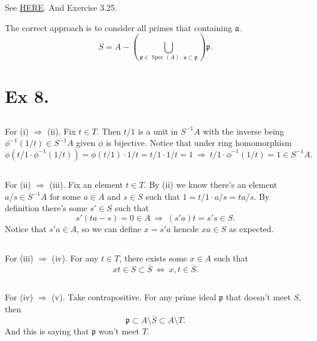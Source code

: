 See \href{https://math.stackexchange.com/questions/1635191/saturation-of-a-multiplicatively-closed-subset}{HERE}. And \cite{altman} Exercise 3.25. 

The correct approach is to consider all primes that containing $\mathfrak a$.
$$\overline{S}=A-\left(\bigcup_{\mathfrak p\in\operatorname{Spec}(A),~ \mathfrak a\subset\mathfrak p}\right)\mathfrak p.$$

\section{Ex 8.}

\subsection{}

For (i) $\Rightarrow$ (ii). Fix $t\in T$. Then $t/1$ is a unit in $S^{-1}A$ with the inverse being $\phi^{-1}(1/t)\in S^{-1}A$ given $\phi$ is bijective. 
Notice that under ring homomorphism 
\[\phi(t/1\cdot\phi^{-1}(1/t))=\phi(t/1)\cdot 1/t=t/1\cdot 1/t=1 ~\Rightarrow~ t/1\cdot\phi^{-1}(1/t)=1\in S^{-1}A.\]

\subsection{}

For (ii) $\Rightarrow$ (iii). Fix an element $t\in T$. By (ii) we know there's an element $a/s\in S^{-1}A$ for some $a\in A$ and $s\in S$ such that $1=t/1\cdot a/s=ta/s$. By definition there's some $s'\in S$ such that \[s'(ta-s)=0\in A ~\Rightarrow~ (s'a)t=s's\in S.\] Notice that $s'a\in A$, so we can define $x=s'a$ hencde $xa\in S$ as expected. 

\subsection{}\label{Atiyah Chapter 3 Ex 8. 3-4}

For (iii) $\Rightarrow$ (iv). For any $t\in T$, there exists some $x\in A$ such that 
\[xt\in S\subset \overline{S} ~\Leftrightarrow~ x,t\in\overline{S}.\]

\subsection{}

For (iv) $\Rightarrow$ (v). Take contrapositive. For any prime ideal $\mathfrak p$ that doesn't meet $S$, then \[\mathfrak p\subset A\setminus \overline{S}\subset A\setminus T.\] And this is saying that $\mathfrak p$ won't meet $T$.

